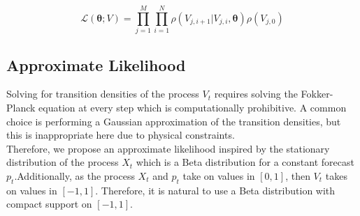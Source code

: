 \documentclass[10pt,twocolumn,letterpaper]{article}
\newcommand{\E}{\mathbb{E}}
\newcommand{\V}{\mathbb{V}}
\begin{document}
\begin{equation}
\mathcal{L}(\bm{\theta};V) =\prod\limits_{j=1}^M \prod\limits_{i=1}^N \rho ( {V_{j,i+1}|V_{j,i}}, \bm{\theta})  \rho (V_{j,0})
\label{likelihood}
\end{equation}

\subsection{Approximate Likelihood}
Solving for transition densities of the process $V_t$ requires solving the Fokker-Planck equation at every step which is computationally prohibitive. A common choice is performing a  Gaussian approximation of the transition densities, but this is inappropriate here due to physical constraints. \\

Therefore, we propose an approximate likelihood inspired by the stationary distribution of the process $X_t$ which is a Beta distribution for a constant forecast $p_t$.Additionally,  as the process $X_t$ and $p_t$ take on values in $[0,1]$, then $V_t$ takes on values in $[-1,1]$. Therefore,  it is natural to use a  Beta distribution with compact support on $[-1,1]$.

%
\end{document}
